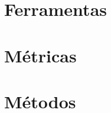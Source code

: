 \chapter{Ferramentas}

\thispagestyle{plain}
 \label{ch:ferramentas}

\chapter{Métricas}
\thispagestyle{plain}
 \label{ch:metricas}


\chapter{Métodos}
\thispagestyle{plain}
 \label{ch:metodos}
